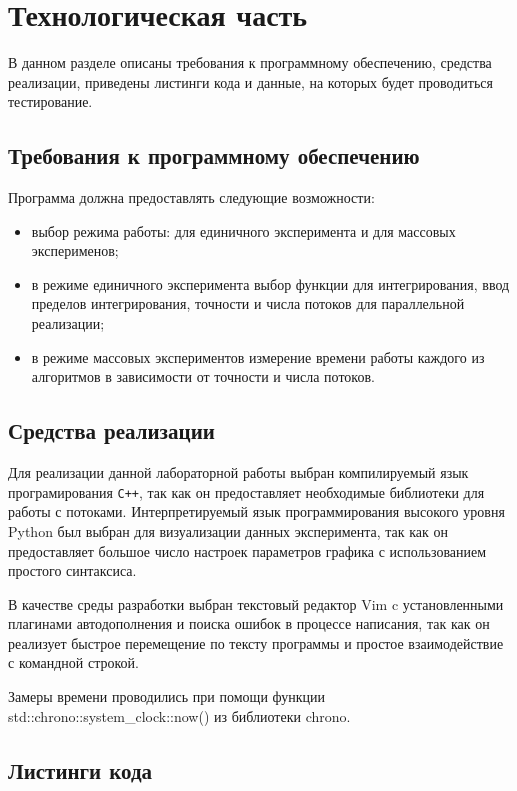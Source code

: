 \chapter{Технологическая часть}

В данном разделе описаны требования к программному обеспечению, средства
реализации, приведены листинги кода и данные, на которых будет проводиться
тестирование.

\section{Требования к программному обеспечению}

Программа должна предоставлять следующие возможности:
\begin{itemize}[left=\parindent]
    \item выбор режима работы: для единичного эксперимента и для массовых
          эксперименов;
    \item в режиме единичного эксперимента выбор функции для интегрирования,
          ввод пределов интегрирования, точности и числа потоков для
          параллельной реализации;
    \item в режиме массовых экспериментов измерение времени работы каждого из
          алгоритмов в зависимости от точности и числа потоков.
\end{itemize}

\section{Средства реализации}

Для реализации данной лабораторной работы выбран компилируемый язык
програмирования \texttt{C++}\cite{cpp}, так как он предоставляет необходимые библиотеки
для работы с потоками. Интерпретируемый язык программирования высокого уровня
Python\cite{python} был выбран для визуализации данных эксперимента, так как он
предоставляет большое число настроек параметров графика с использованием
простого синтаксиса. 

В качестве среды разработки выбран текстовый редактор Vim\cite{vim} c
установленными плагинами автодополнения и поиска ошибок в процессе написания,
так как он реализует быстрое перемещение по тексту программы и простое
взаимодействие с командной строкой.

Замеры времени проводились при помощи функции std::chrono::system\_clock::now() из библиотеки
chrono\cite{chrono}.

\section{Листинги кода}

